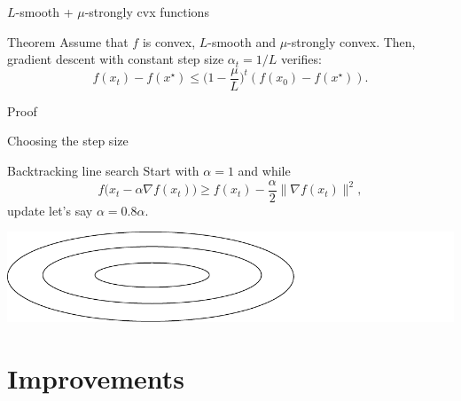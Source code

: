 \documentclass{beamer}
\begin{document}
\begin{frame}[t]{$L$-smooth + $\mu$-strongly cvx functions}
	\grid

	\vspace{-0.4cm}
	\begin{block}{Theorem}
		Assume that $f$ is convex, $L$-smooth and $\mu$-strongly convex.
		Then, gradient descent with constant step size $\alpha_t = 1/L$ verifies:
		$$
		f(x_t) - f(x^{\star}) \leq \Big(1 - \frac{\mu}{L} \Big)^t (f(x_0) - f(x^{\star})).
		$$
	\end{block}
\end{frame}

\begin{frame}[t]{Proof}
	\grid

\end{frame}


\begin{frame}[t]{Choosing the step size}
	\grid

	\begin{block}{Backtracking line search}
		Start with $\alpha = 1$ and while
		$$
		f\big(x_t - \alpha \nabla f(x_t) \big) \geq f(x_t) - \frac{\alpha}{2} \|\nabla f(x_t) \|^2,
		$$
		update let's say $\alpha = 0.8 \alpha$.
	\end{block}
	\vspace{0.7cm}
	\hspace*{0.7cm}\includegraphics[width=15cm]{../figures/contour.pdf}
\end{frame}



\section{Improvements}
\end{document}
